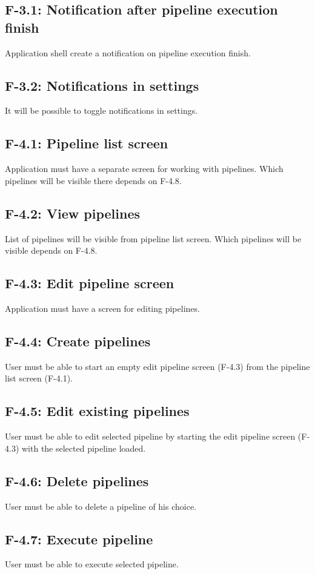 \subsection*{F-3.1: Notification after pipeline execution finish}
\label{subsec:notifications}
Application shell create a notification on pipeline execution finish.
\subsection*{F-3.2: Notifications in settings}
It will be possible to toggle notifications in settings.
\subsection*{F-4.1: Pipeline list screen}
Application must have a separate screen for working with pipelines. Which pipelines will be visible there depends on F-4.8.
\subsection*{F-4.2: View pipelines}
List of pipelines will be visible from pipeline list screen. Which pipelines will be visible depends on F-4.8.
\subsection*{F-4.3: Edit pipeline screen}
\label{subsec:editpipelinescreen}
Application must have a screen for editing pipelines.
\subsection*{F-4.4: Create pipelines}
User must be able to start an empty edit pipeline screen (F-4.3) from the pipeline list screen (F-4.1).
\subsection*{F-4.5: Edit existing pipelines}
User must be able to edit selected pipeline by starting the edit pipeline screen (F-4.3) with the selected pipeline loaded.
\subsection*{F-4.6: Delete pipelines}
User must be able to delete a pipeline of his choice.
\subsection*{F-4.7: Execute pipeline}
User must be able to execute selected pipeline.
